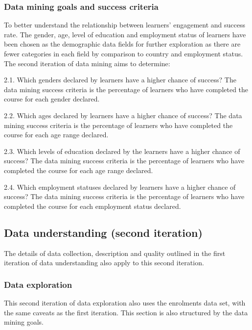 \documentclass[
]{article}
\begin{document}
\hypertarget{data-mining-goals-and-success-criteria-1}{%
\subsubsection{Data mining goals and success
criteria}\label{data-mining-goals-and-success-criteria-1}}

To better understand the relationship between learners' engagement and
success rate. The gender, age, level of education and employment status
of learners have been chosen as the demographic data fields for further
exploration as there are fewer categories in each field by comparison to
country and employment status. The second iteration of data mining aims
to determine:

2.1. Which genders declared by learners have a higher chance of success?
The data mining success criteria is the percentage of learners who have
completed the course for each gender declared.

2.2. Which ages declared by learners have a higher chance of success?
The data mining success criteria is the percentage of learners who have
completed the course for each age range declared.

2.3. Which levels of education declared by the learners have a higher
chance of success? The data mining success criteria is the percentage of
learners who have completed the course for each age range declared.

2.4. Which employment statuses declared by learners have a higher chance
of success? The data mining success criteria is the percentage of
learners who have completed the course for each employment status
declared.

\hypertarget{data-understanding-second-iteration}{%
\subsection{Data understanding (second
iteration)}\label{data-understanding-second-iteration}}

The details of data collection, description and quality outlined in the
first iteration of data understanding also apply to this second
iteration.

\hypertarget{data-exploration-1}{%
\subsubsection{Data exploration}\label{data-exploration-1}}

This second iteration of data exploration also uses the enrolments data
set, with the same caveats as the first iteration. This section is also
structured by the data mining goals.
\end{document}
